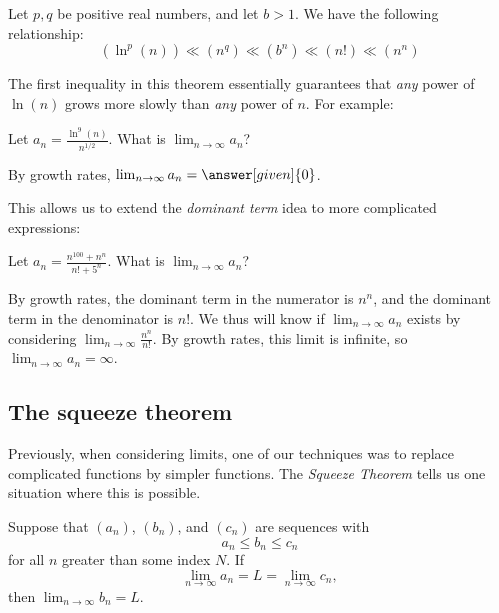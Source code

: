 \documentclass{ximera}
\begin{document}
\begin{theorem}
  Let $p,q$ be positive real numbers, and let $b> 1$. We have the
  following relationship:
  \[
  (\ln^p(n))\ll (n^q) \ll (b^n) \ll (n!) \ll (n^n)
  \]
\end{theorem}

The first inequality in this theorem essentially guarantees that \emph{any} power of $\ln(n)$ grows more slowly than \emph{any} power of $n$.  For example: 

\begin{example}
  Let $a_n  = \frac{\ln^{9}(n)}{n^{1/2}}$.  What is $\lim_{n \to \infty} a_n$?
  
  \begin{explanation}
  By growth rates, $\lim_{n\to\infty}a_n =\answer[given]{0}$.  
  
  \end{explanation}
\end{example}

This allows us to extend the \emph{dominant term} idea to more complicated expressions:

\begin{example}
  Let $a_n  = \frac{n^{100} + n^n}{n!+5^n}$.  What is $\lim_{n \to \infty} a_n$?
  
  \begin{explanation}
  By growth rates, the dominant term in the numerator is $n^n$, and the dominant term in the denominator is $n!$.  We thus will know if $\lim_{n \to \infty} a_n$ exists by considering $\lim_{n \to \infty} \frac{n^n}{n!}$.  By growth rates, this limit is infinite, so $\lim_{n \to \infty} a_n = \infty$.
  
  \end{explanation}
\end{example}

\subsection{The squeeze theorem}

Previously, when considering limits, one of our techniques was to replace 
complicated functions by simpler functions. The \textit{Squeeze Theorem}
tells us one situation where this is possible.

\begin{theorem}
  Suppose that $(a_n)$, $(b_n)$, and $(c_n)$ are sequences with
  \[
  a_n \le b_n \le c_n
  \]
  for all $n$ greater than some index $N$. If
  \[
  \lim_{n\to\infty} a_n = L = \lim_{n\to\infty} c_n,
  \] 
  then $\lim_{n\to\infty} b_n = L$.
\end{theorem}
\end{document}
